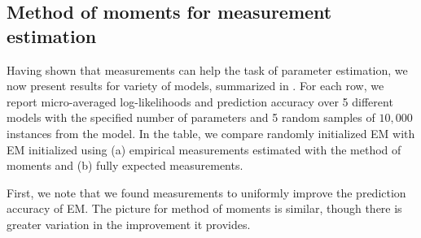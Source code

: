 
\subsection{Method of moments for measurement estimation}

Having shown that measurements can help the task of parameter estimation, we now present results for variety of models, summarized in . 
For each row, we report micro-averaged log-likelihoods and prediction accuracy over 5 different models with the specified number of parameters and 5 random samples of $10,000$ instances from the model. 
In the table, we compare randomly initialized EM with EM initialized using (a) empirical measurements estimated with the method of moments and (b) fully expected measurements.

First, we note that we found measurements to uniformly improve the prediction accuracy of EM. The picture for method of moments is similar, though there is greater variation in the improvement it provides.


% 
% 
% 
% 
% 
% 
% 
% 
% 
% 
% 
% 

